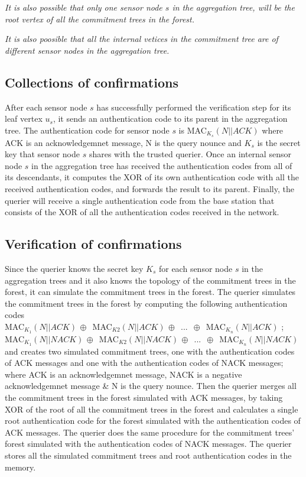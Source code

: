 	\textit{It is also possible that only one sensor node $s$ in the aggregation tree, will be the root vertex of all the commitment trees in the forest.} 

	\textit{It is also poosible that all the internal vetices in the commitment tree are of different sensor nodes in the aggregation tree.}


\subsection{Collections of confirmations}
After each sensor node $s$ has successfully performed the 
verification step for its leaf vertex $u_{s}$, it sends an 
authentication code to its parent in the aggregation tree.
The authentication code for sensor node $s$ is MAC$_{K_{s}}(N||ACK)$
where ACK is an acknowledgemnet message, N is the query nounce and $K_{s}$ 
is the secret key that sensor node $s$ shares with the trusted querier. Once
an internal sensor node $s$ in the aggregation tree has received the
authentication codes from all of its descendants, it computes the XOR of its 
own authentication code with all the received authentication codes, and 
forwards the result to its parent. Finally, the querier will receive a 
single authentication code from the base station that consists of the XOR of 
all the authentication codes received in the network. 

\subsection{Verification of confirmations}
Since the querier knows the secret key $K_{s}$ for each sensor node $s$ in the aggregation trees and it also knows the topology of the commitment trees in the forest, it can simulate the commitment trees in the forest. The querier simulates the commitment trees in the forest by computing the following authentication codes\\


MAC$_{K_{1}}(N||ACK)\,\oplus\,$ 
MAC$_{K2}(N||ACK)\,\oplus\,$
...
$\,\oplus\,$
MAC$_{K_{n}}(N||ACK)$ ; \\


MAC$_{K_{1}}(N||NACK)\,\oplus\,$ 
MAC$_{K2}(N||NACK)\,\oplus\,$
...
$\,\oplus\,$
MAC$_{K_{n}}(N||NACK)$  \\


and creates two simulated commitment trees, one with the authentication codes of ACK messages and one with the authentication codes of NACK messages; where ACK is an acknowledgemnet message, NACK is a negative acknowledgemnet message \& N is the query nounce. Then the querier merges all the commitment trees in the forest simulated with ACK messages, by taking XOR of the root of all the commitment trees in the forest and calculates a single root authentication code for the forest simulated with the authentication codes of ACK messages. The querier does the same procedure for the commitment trees' forest simulated with the authentication codes of NACK messages. The querier stores all the simulated commitment trees and root authentication codes in the memory. \\


